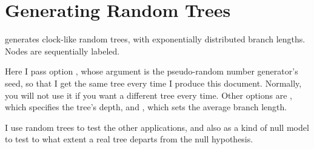 \section[sct_gen]{Generating Random Trees}


\gen{} generates clock-like random trees, with exponentially distributed branch
lengths. Nodes are sequentially labeled.


Here I pass option , whose argument is the pseudo-random number
generator's seed, so that I get the same tree every time I produce this
document. Normally, you will not use it if you want a different tree every
time.  Other options are , which specifies the tree's depth, and
, which sets the average branch length.

I use random trees to test the other applications, and also as a kind of null
model to test to what extent a real tree departs from the null hypothesis.
